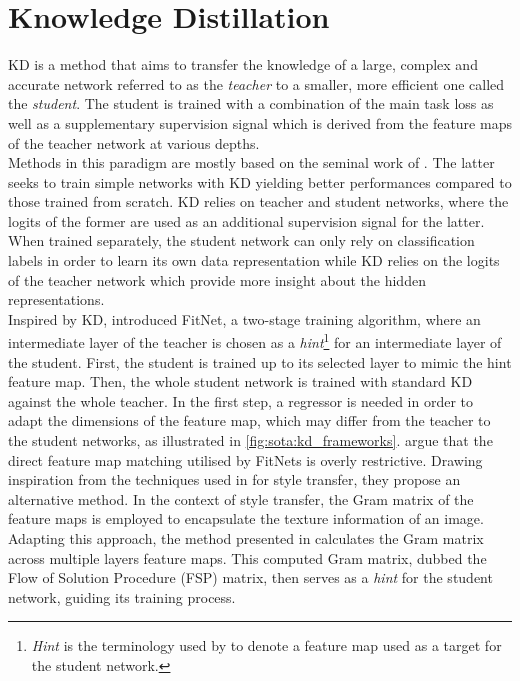 \section{Knowledge Distillation}

\acf{KD} is a method that aims to transfer the knowledge of a large, complex and
accurate network referred to as the \emph{teacher} to a smaller, more efficient
one called the \emph{student}. The student is trained with a combination of the
main task loss as well as a supplementary supervision signal which is derived
from the feature maps of the teacher network at various depths.\\

Methods in this paradigm are mostly based on the seminal work of
\citeauthor{DBLP:journals/corr/HintonVD15} \cite{DBLP:journals/corr/HintonVD15}.
The latter seeks to train simple networks with \acl{KD} yielding better
performances compared to those trained from scratch. \ac{KD} relies on teacher
and student networks, where the logits of the former are used as an additional
supervision signal for the latter. When trained separately, the student network
can only rely on classification labels in order to learn its own data
representation while \ac{KD} relies on the logits of the teacher network which
provide more insight about the hidden representations.\\

Inspired by \ac{KD}, \cite{DBLP:journals/corr/RomeroBKCGB14} introduced FitNet,
a two-stage training algorithm, where an intermediate layer of the teacher is
chosen as a \emph{hint}\footnote{\emph{Hint} is the terminology used by
\citeauthor{DBLP:journals/corr/RomeroBKCGB14}
\cite{DBLP:journals/corr/RomeroBKCGB14} to denote a feature map used as a target
for the student network.} for an intermediate layer of the student. First, the
student is trained up to its selected layer to mimic the hint feature map. Then,
the whole student network is trained with standard \ac{KD} against the whole
teacher. In the first step, a regressor is needed in order to adapt the
dimensions of the feature map, which may differ from the teacher to the student
networks, as illustrated in \cref{fig:sota:kd_frameworks}.
\citeauthor{DBLP:conf/cvpr/YimJBK17} argue that the direct feature map matching
utilised by FitNets is overly restrictive. Drawing inspiration from the
techniques used in \cite{DBLP:journals/corr/GatysEB15a} for style transfer, they
propose an alternative method. In the context of style transfer, the Gram matrix
of the feature maps is employed to encapsulate the texture information of an
image. Adapting this approach, the method presented in
\cite{DBLP:conf/cvpr/YimJBK17} calculates the Gram matrix across multiple layers
feature maps. This computed Gram matrix, dubbed the Flow of Solution Procedure
(FSP) matrix, then serves as a \emph{hint} for the student network, guiding its
training process.\\

